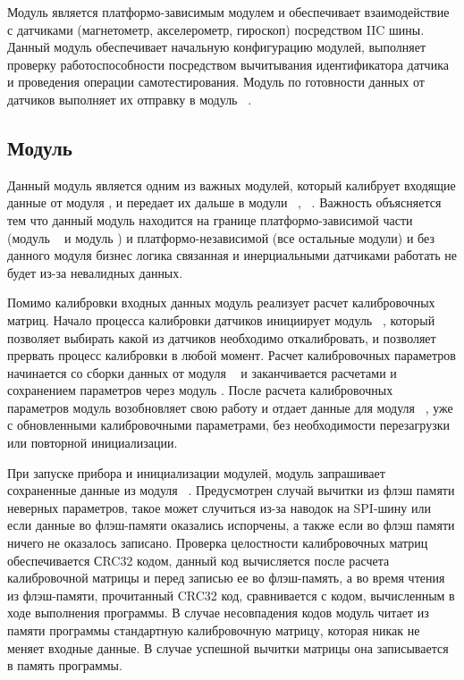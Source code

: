 Модуль \modulePerifery является платформо-зависимым модулем и обеспечивает взаимодействие с датчиками
(магнетометр, акселерометр, гироскоп) посредством IIC шины. Данный модуль обеспечивает начальную конфигурацию 
модулей, выполняет проверку работоспособности посредством вычитывания идентификатора датчика и проведения 
операции самотестирования. Модуль по готовности данных от датчиков выполняет их отправку в модуль \moduleCalib~.

\subsection{Модуль \moduleCalib}

Данный модуль является одним из важных модулей, который калибрует входящие данные от модуля \modulePerifery, и передает их дальше
в модули \moduleMoveDetect~, \moduleOrientationAzimuth~. Важность объясняется тем что данный модуль 
находится на границе платформо-зависимой части (модуль \modulePerifery~ и модуль \moduleFlashMemory) и платформо-независимой (все остальные модули) и 
без данного модуля бизнес логика связанная и инерциальными датчиками работать не будет из-за невалидных данных.

Помимо калибровки входных данных модуль реализует расчет калибровочных матриц. Начало процесса калибровки датчиков инициирует модуль \moduleCalibControl~,
который позволяет выбирать какой из датчиков необходимо откалибровать, и позволяет прервать процесс калибровки в любой момент. Расчет калибровочных 
параметров начинается со сборки данных от модуля \modulePerifery~ и заканчивается расчетами и сохранением параметров через модуль \moduleFlashMemory.
После расчета калибровочных параметров модуль возобновляет свою работу и отдает данные для модуля \moduleOrientationAzimuth~, \moduleMoveDetect
уже с обновленными калибровочными параметрами, без необходимости перезагрузки или повторной инициализации. 

При запуске прибора и инициализации модулей, модуль \moduleCalib запрашивает сохраненные данные из модуля \moduleFlashMemory~.
Предусмотрен случай вычитки из флэш памяти неверных параметров, такое может случиться из-за наводок на SPI-шину или если данные во флэш-памяти
оказались испорчены, а также если во флэш памяти ничего не оказалось записано.
Проверка целостности калибровочных матриц обеспечивается СRC32 кодом,
данный код вычисляется после расчета калибровочной матрицы и перед записью ее во флэш-память, а во время чтения из флэш-памяти, прочитанный
CRC32 код, сравнивается с кодом, вычисленным в ходе выполнения программы.
В случае несовпадения кодов модуль читает из памяти программы
стандартную калибровочную матрицу, которая никак не меняет входные данные. В случае успешной вычитки матрицы она записывается в память программы.

